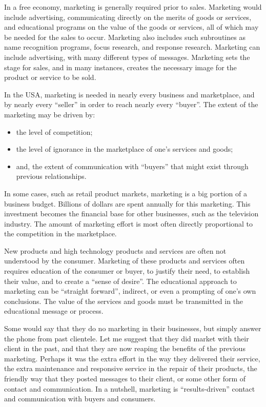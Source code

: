 \documentclass[12pt]{memoir}
\begin{document}
In a free economy, marketing is generally required prior to sales.
Marketing would include advertising, communicating directly on the
merits of goods or services, and educational programs on the value
of the goods or services, all of which may be needed for the sales
to occur. Marketing also includes such subroutines as name recognition
programs, focus research, and response research. Marketing can include
advertising, with many different types of messages. Marketing sets
the stage for sales, and in many instances, creates the necessary
image for the product or service to be sold.

In the USA, marketing is needed in nearly every business and marketplace,
and by nearly every ``seller'' in order to reach nearly every ``buyer''.
The extent of the marketing may be driven by: 
\begin{itemize}
\item the level of competition; 
\item the level of ignorance in the marketplace of one's services and goods; 
\item and, the extent of communication with ``buyers'' that might exist
through previous relationships. 
\end{itemize}
In some cases, such as retail product markets, marketing is a big
portion of a business budget. Billions of dollars are spent annually
for this marketing. This investment becomes the financial base for
other businesses, such as the television industry. The amount of marketing
effort is most often directly proportional to the competition in the
marketplace.

New products and high technology products and services are often not
understood by the consumer. Marketing of these products and services
often requires education of the consumer or buyer, to justify their
need, to establish their value, and to create a ``sense of desire''.
The educational approach to marketing can be ``straight forward'',
indirect, or even a prompting of one's own conclusions. The value
of the services and goods must be transmitted in the educational message
or process.

Some would say that they do no marketing in their businesses, but
simply answer the phone from past clientele. Let me suggest that they
did market with their client in the past, and that they are now reaping
the benefits of the previous marketing. Perhaps it was the extra effort
in the way they delivered their service, the extra maintenance and
responsive service in the repair of their products, the friendly way
that they posted messages to their client, or some other form of contact
and communication. In a nutshell, marketing is ``results-driven''
contact and communication with buyers and consumers.
\end{document}

